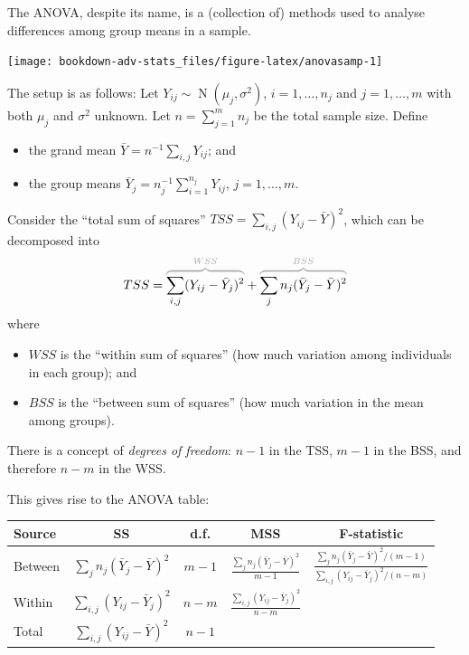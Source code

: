 \documentclass[
]{book}
\providecommand{\tightlist}{%
  \setlength{\itemsep}{0pt}\setlength{\parskip}{0pt}}
\DeclareMathOperator{\N}{N}
\newcommand{\myoverbrace}[3][gray!70]{{\color{#1}\overbrace{\color{black}#2}^{#3}}}
\theoremstyle{definition}
\theoremstyle{definition}
\theoremstyle{definition}
\theoremstyle{definition}
\theoremstyle{remark}
\begin{document}
The ANOVA, despite its name, is a (collection of) methods used to analyse differences among group means in a sample.

\begin{center}\texttt{[image: bookdown-adv-stats\_files/figure-latex/anovasamp-1]} \end{center}

The setup is as follows:
Let \(Y_{ij}\sim\N(\mu_j,\sigma^2)\), \(i=1,\dots,n_j\) and \(j=1,\dots,m\) with both \(\mu_j\) and \(\sigma^2\) unknown.
Let \(n=\sum_{j=1}^m n_j\) be the total sample size.
Define

\begin{itemize}
\tightlist
\item
  the grand mean \(\bar Y = n^{-1}\sum_{i,j} Y_{ij}\); and
\item
  the group means \(\bar Y_j = n_j^{-1} \sum_{i=1}^{n_j} Y_{ij}\), \(j=1,\dots,m\).
\end{itemize}

Consider the ``total sum of squares'' \(TSS = \sum_{i,j}(Y_{ij} - \bar Y)^2\), which can be decomposed into \[TSS = 
  \myoverbrace{\sum_{i,j} (Y_{ij} - \bar Y_j)^2}{WSS} +
  \myoverbrace{\sum_{j} n_j(\bar Y_j - \bar Y)^2}{BSS}\] where

\begin{itemize}
\tightlist
\item
  \(WSS\) is the ``within sum of squares'' (how much variation among individuals
  in each group); and
\item
  \(BSS\) is the ``between sum of squares'' (how much
  variation in the mean among groups).
\end{itemize}

There is a concept of \emph{degrees of freedom}: \(n-1\) in the TSS, \(m-1\) in
the BSS, and therefore \(n-m\) in the WSS.

This gives rise to the ANOVA table:

\begin{longtable}[]{@{}lcccc@{}}
\toprule
Source & SS & d.f. & MSS & F-statistic \\
\midrule
\endhead
Between & \(\sum_{j} n_j(\bar Y_j - \bar Y)^2\) & \(m-1\) & \(\frac{\sum_{j} n_j(\bar Y_j - \bar Y)^2}{m-1}\) & \(\frac{\sum_{j} n_j(\bar Y_j - \bar Y)^2/(m-1)}{\sum_{i,j} (Y_{ij} - \bar Y_j)^2/(n-m)}\) \\
Within & \(\sum_{i,j} (Y_{ij} - \bar Y_j)^2\) & \(n-m\) & \(\frac{\sum_{i,j} (Y_{ij} - \bar Y_j)^2}{n-m}\) & \\
Total & \(\sum_{i,j}(Y_{ij} - \bar Y)^2\) & \(n-1\) & & \\
\bottomrule
\end{longtable}
\end{document}
